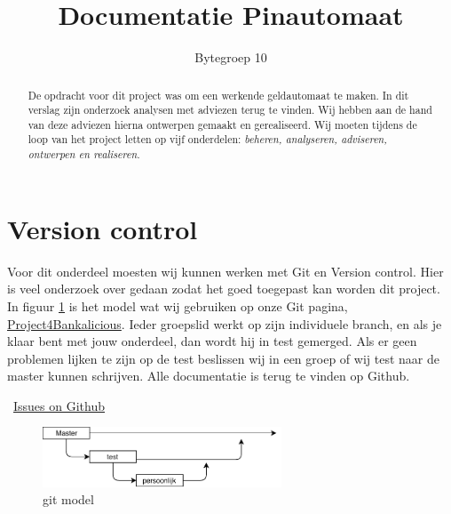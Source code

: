\documentclass{article}
\begin{document}
\title{Documentatie Pinautomaat}
\author{Bytegroep 10}

\maketitle

\begin{abstract}

De opdracht voor dit project was om een werkende geldautomaat te maken.
In dit verslag zijn onderzoek analysen met adviezen terug te vinden.
Wij hebben aan de hand van deze adviezen hierna ontwerpen gemaakt en gerealiseerd.
Wij moeten tijdens de loop van het project letten op vijf onderdelen: \emph{beheren, analyseren, adviseren, ontwerpen en realiseren.}

\end{abstract}

\newpage

\tableofcontents

\newpage

\section{Version control}

Voor dit onderdeel moesten wij kunnen werken met Git en Version control.
Hier is veel onderzoek over gedaan zodat het goed toegepast kan worden dit project.
In figuur \ref{fig: git model} is het model wat wij gebruiken op onze Git pagina, \href{https://github.com/Gewad/Project4Bankalicious}{Project4Bankalicious}.
Ieder groepslid werkt op zijn individuele branch, en als je klaar bent met jouw onderdeel, dan wordt hij in test gemerged.
Als er geen problemen lijken te zijn op de test beslissen wij in een groep of wij test naar de master kunnen schrijven.
Alle documentatie is terug te vinden op Github.\

\vspace{1mm}

\Mundus~\href{https://github.com/Gewad/Project4Bankalicious/issues}{Issues on Github}

\begin{figure}[!h]
        \centering
        \includegraphics[height=0.7in]{git.pdf}
        \caption{git model}
        \label{fig: git model}
\end{figure}
\end{document}
